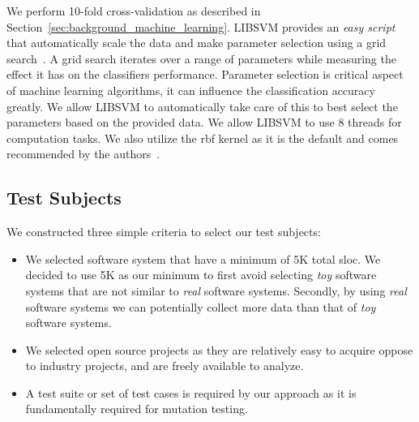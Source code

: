 We perform 10-fold cross-validation as described in Section~\ref{sec:background_machine_learning}. LIBSVM provides an \emph{easy script} that automatically scale the data and make parameter selection using a grid search~\cite{HCL03}. A grid search iterates over a range of parameters while measuring the effect it has on the classifiers performance. Parameter selection is critical aspect of machine learning algorithms, it can influence the classification accuracy greatly. We allow LIBSVM to automatically take care of this to best select the parameters based on the provided data. We allow LIBSVM to use 8 threads for computation tasks. We also utilize the \gls{rbf} kernel as it is the default and comes recommended by the authors~\cite{HCL03}.

\subsection{Test Subjects}
\label{subsec:experiment_test_subjects}
We constructed three simple criteria to select our test subjects:

\begin{itemize}
  \item We selected software system that have a minimum of 5K total \gls{sloc}. We decided to use 5K as our minimum to first avoid selecting \emph{toy} software systems that are not similar to \emph{real} software systems. Secondly, by using \emph{real} software systems we can potentially collect more data than that of \emph{toy} software systems.
  \item We selected open source projects as they are relatively easy to acquire oppose to industry projects, and are freely available to analyze.
  \item A test suite or set of test cases is required by our approach as it is fundamentally required for mutation testing.
\end{itemize}

